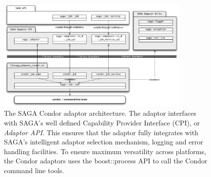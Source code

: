\begin{figure}
  \includegraphics[angle=90, width=0.85\textwidth]{./figures/condor_adaptor_arch}
  \caption{\footnotesize The SAGA Condor adaptor architecture. The adaptor interfaces
  with SAGA's well defined Capability Provider Interface (CPI), or \textit{Adaptor API}.
  This ensures that the adaptor fully integrates with SAGA's intelligent adaptor selection
  mechanism, logging and error handling facilities. To ensure maximum versatility across
  platforms, the Condor adaptors uses the boost::process API to call the Condor command 
  line tools. }
  
\label{adaptor_arch}
\end{figure}






